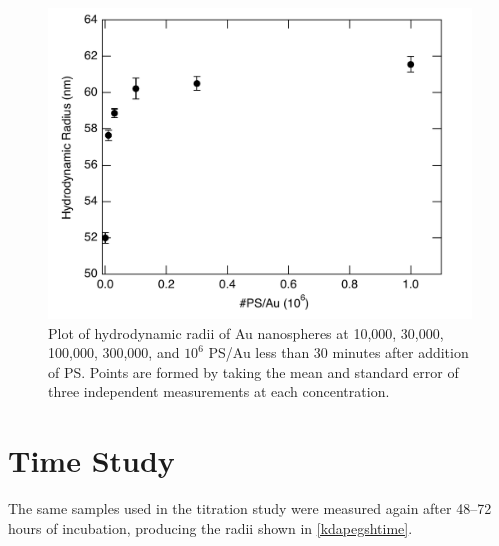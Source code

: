 \begin{figure}[htbp]
\centering
\includegraphics[keepaspectratio,width=\textwidth,height=0.75\textheight]{ImmediateAvg.pdf}
\caption{Plot of hydrodynamic radii of Au nanospheres at 10,000, 30,000, 100,000, 300,000, and $10^6$ PS\slash Au less than 30 minutes after addition of PS. Points are formed by taking the mean and standard error of three independent measurements at each concentration.}
\label{kdapegshnewavg}
\end{figure}



\section{Time Study}
\label{timestudy}

The same samples used in the titration study were measured again after 48--72 hours of incubation, producing the radii shown in \autoref{kdapegshtime}.

